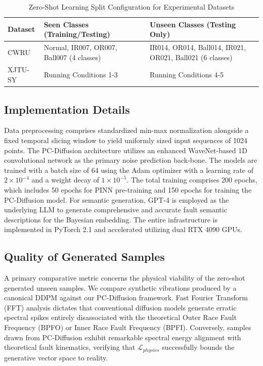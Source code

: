 \begin{table}[ht]
\centering
\caption{Zero-Shot Learning Split Configuration for Experimental Datasets}
\label{tab:zsl_split}
\begin{tabular}{lll}
\toprule
\textbf{Dataset} & \textbf{Seen Classes (Training/Testing)} & \textbf{Unseen Classes (Testing Only)} \\
\midrule
CWRU & Normal, IR007, OR007, Ball007 (4 classes) & IR014, OR014, Ball014, IR021, OR021, Ball021 (6 classes) \\
XJTU-SY & Running Conditions 1-3 & Running Conditions 4-5 \\
\bottomrule
\end{tabular}
\end{table}

\subsection{Implementation Details}
Data preprocessing comprises standardized min-max normalization alongside a fixed temporal slicing window to yield uniformly sized input sequences of 1024 points. The PC-Diffusion architecture utilizes an enhanced WaveNet-based 1D convolutional network as the primary noise prediction back-bone. The models are trained with a batch size of 64 using the Adam optimizer with a learning rate of $2 \times 10^{-4}$ and a weight decay of $1 \times 10^{-5}$. The total training comprises 200 epochs, which includes 50 epochs for PINN pre-training and 150 epochs for training the PC-Diffusion model. For semantic generation, GPT-4 is employed as the underlying LLM to generate comprehensive and accurate fault semantic descriptions for the Bayesian embedding. The entire infrastructure is implemented in PyTorch 2.1 and accelerated utilizing dual RTX 4090 GPUs.

\subsection{Quality of Generated Samples}
A primary comparative metric concerns the physical viability of the zero-shot generated unseen samples. We compare synthetic vibrations produced by a canonical DDPM \cite{ho2020denoising} against our PC-Diffusion framework. Fast Fourier Transform (FFT) analysis dictates that conventional diffusion models generate erratic spectral spikes entirely disassociated with the theoretical Outer Race Fault Frequency (BPFO) or Inner Race Fault Frequency (BPFI). Conversely, samples drawn from PC-Diffusion exhibit remarkable spectral energy alignment with theoretical fault kinematics, verifying that $\mathcal{L}_{physics}$ successfully bounds the generative vector space to reality.

